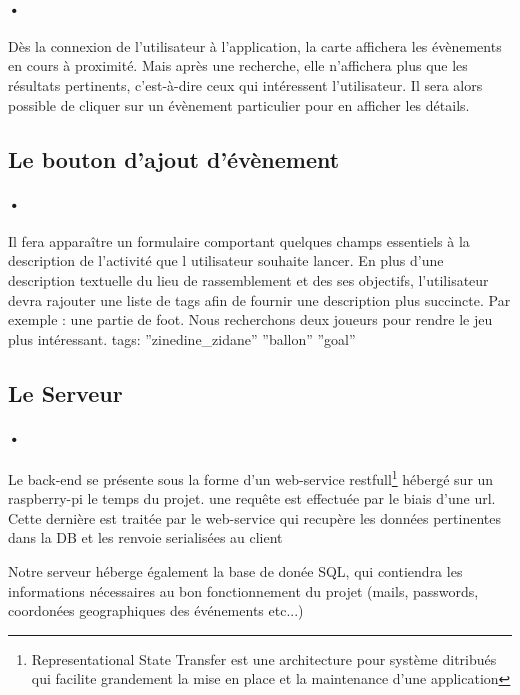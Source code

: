 \documentclass[pdftex,12pt,a4paper]{article}
\begin{document}
\paragraph{•}
D\`es la connexion de l'utilisateur \`a l'application, la carte affichera les \'ev\`enements en cours \`a proximit\'e. Mais apr\`es une recherche, elle n'affichera plus que les r\'esultats pertinents, c’est-\`a-dire ceux qui int\'eressent l'utilisateur. Il sera alors possible de cliquer sur un \'ev\`enement particulier pour en afficher les d\'etails. 

\subsection{Le bouton d'ajout d'\'ev\`enement}
\paragraph{•}
Il fera appara\^itre un formulaire comportant quelques champs essentiels à la description de l'activit\'e que l utilisateur souhaite lancer. En plus d'une description textuelle du lieu de rassemblement et des ses objectifs, l'utilisateur devra rajouter une liste de tags afin de fournir une description plus succincte.
Par exemple : une partie de foot. Nous recherchons deux joueurs pour rendre le jeu plus int\'eressant. tags: ''zinedine\_zidane'' ''ballon'' ''goal''

\subsection{Le Serveur}
\paragraph{•}
Le back-end se pr\'esente sous la forme d'un web-service restfull\footnote{Representational State Transfer est une architecture 
pour syst\`eme ditribu\'es qui facilite grandement la mise en place et la maintenance d'une application} h\'eberg\'e sur un raspberry-pi le temps du projet.
une requ\^ete est effectu\'ee par le biais d'une url. Cette derni\`ere est trait\'ee par le web-service 
qui recup\`ere les donn\'ees pertinentes dans la DB et les renvoie serialis\'ees au client

Notre serveur h\'eberge \'egalement la base de don\'ee SQL, qui contiendra les informations n\'ecessaires au bon fonctionnement du projet (mails, passwords, coordon\'ees geographiques des \'ev\'enements etc...)

\newpage
\end{document}
